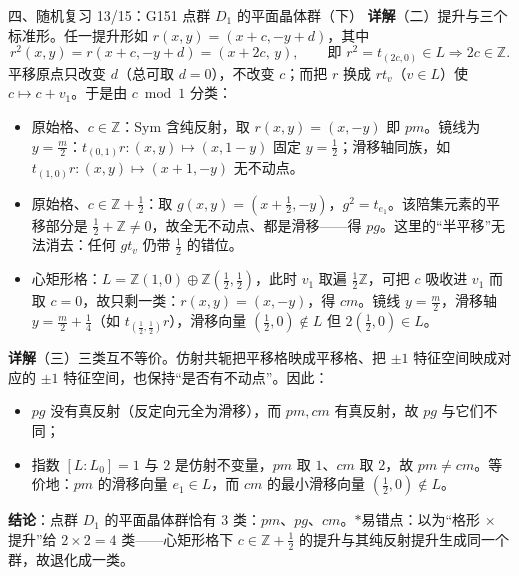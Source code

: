 \documentclass[aspectratio=169,10pt,fontset=none]{ctexbeamer}
\newcommand{\key}[1]{\textcolor{ink}{\bfseries #1}}
\newcommand{\starpt}{\textcolor{accent}{\bfseries$\ast$}}
\begin{document}
\begin{frame}[t]{四、随机复习 13/15：G151 点群 $D_1$ 的平面晶体群（下）}
\scriptsize
\key{详解}（二）提升与三个标准形。任一提升形如 $r(x,y)=(x+c,-y+d)$，其中
\[ r^2(x,y)=r(x+c,-y+d)=(x+2c,\,y),\qquad\text{即 } r^2=t_{(2c,0)}\in L\Longrightarrow 2c\in\mathbb Z. \]
平移原点只改变 $d$（总可取 $d=0$），不改变 $c$；而把 $r$ 换成 $rt_v$（$v\in L$）使 $c\mapsto c+v_1$。于是由 $c\bmod 1$ 分类：
\begin{itemize}\setlength{\itemsep}{1pt}\setlength{\parsep}{0pt}
\item 原始格、$c\in\mathbb Z$：$\mathrm{Sym}$ 含纯反射，取 $r(x,y)=(x,-y)$ 即 $pm$。镜线为 $y=\frac m2$：$t_{(0,1)}r:(x,y)\mapsto(x,1-y)$ 固定 $y=\frac12$；滑移轴同族，如 $t_{(1,0)}r:(x,y)\mapsto(x+1,-y)$ 无不动点。
\item 原始格、$c\in\mathbb Z+\frac12$：取 $g(x,y)=(x+\frac12,-y)$，$g^2=t_{e_1}$。该陪集元素的平移部分是 $\frac12+\mathbb Z\ne0$，故全无不动点、都是滑移——得 $pg$。这里的“半平移”无法消去：任何 $gt_v$ 仍带 $\frac12$ 的错位。
\item 心矩形格：$L=\mathbb Z(1,0)\oplus\mathbb Z(\frac12,\frac12)$，此时 $v_1$ 取遍 $\frac12\mathbb Z$，可把 $c$ 吸收进 $v_1$ 而取 $c=0$，故只剩一类：$r(x,y)=(x,-y)$，得 $cm$。镜线 $y=\frac m2$，滑移轴 $y=\frac m2+\frac14$（如 $t_{(\frac12,\frac12)}r$），滑移向量 $(\frac12,0)\notin L$ 但 $2(\frac12,0)\in L$。
\end{itemize}
\key{详解}（三）三类互不等价。仿射共轭把平移格映成平移格、把 $\pm1$ 特征空间映成对应的 $\pm1$ 特征空间，也保持“是否有不动点”。因此：
\begin{itemize}\setlength{\itemsep}{1pt}\setlength{\parsep}{0pt}
\item $pg$ 没有真反射（反定向元全为滑移），而 $pm,cm$ 有真反射，故 $pg$ 与它们不同；
\item 指数 $[L:L_0]=1$ 与 $2$ 是仿射不变量，$pm$ 取 $1$、$cm$ 取 $2$，故 $pm\ne cm$。等价地：$pm$ 的滑移向量 $e_1\in L$，而 $cm$ 的最小滑移向量 $(\frac12,0)\notin L$。
\end{itemize}
\key{结论}：点群 $D_1$ 的平面晶体群恰有 $3$ 类：$pm$、$pg$、$cm$。\starpt 易错点：以为“格形 $\times$ 提升”给 $2\times2=4$ 类——心矩形格下 $c\in\mathbb Z+\frac12$ 的提升与其纯反射提升生成同一个群，故退化成一类。
\end{frame}
\end{document}
